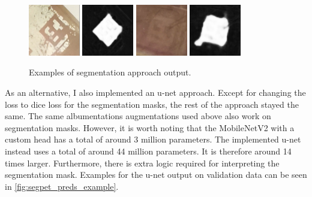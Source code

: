 \documentclass[10pt]{book}
\newcommand{\figureref}[1]{\autoref{#1}}
\begin{document}
\begin{figure}
  \centering
     {\includegraphics[width=0.2\textwidth]{image/segpet_1_in}}
     {\includegraphics[width=0.2\textwidth]{image/segpet_1_pred}}
     {\includegraphics[width=0.2\textwidth]{image/segpet_3_in}}
     {\includegraphics[width=0.2\textwidth]{image/segpet_3_pred}}
  \caption{Examples of segmentation approach output.}
  \label{fig:segpet_preds_example}
\end{figure}

As an alternative, I also implemented an u-net approach. Except for changing the loss to dice loss for the segmentation masks, the rest of the approach stayed the same. The same albumentations augmentations used above also work on segmentation masks. However, it is worth noting that the MobileNetV2 with a custom head has a total of around 3 million parameters. The implemented u-net instead uses a total of around 44 million parameters. It is therefore around 14 times larger. Furthermore, there is extra logic required for interpreting the segmentation mask. 
Examples for the u-net output on validation data can be seen in \figureref{fig:segpet_preds_example}. 
\end{document}
